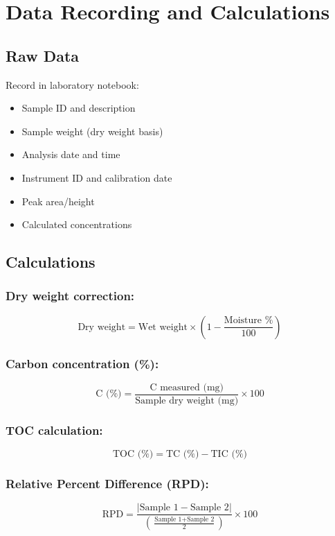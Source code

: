 \documentclass[11pt,a4paper]{article}\usepackage[]{graphicx}\usepackage[]{xcolor}
\begin{document}
\section{Data Recording and Calculations}

\subsection{Raw Data}
Record in laboratory notebook:
\begin{itemize}[noitemsep]
    \item Sample ID and description
    \item Sample weight (dry weight basis)
    \item Analysis date and time
    \item Instrument ID and calibration date
    \item Peak area/height
    \item Calculated concentrations
\end{itemize}

\subsection{Calculations}

\subsubsection{Dry weight correction:}
\begin{equation}
\text{Dry weight} = \text{Wet weight} \times \left(1 - \frac{\text{Moisture \%}}{100}\right)
\end{equation}

\subsubsection{Carbon concentration (\%):}
\begin{equation}
\text{C (\%)} = \frac{\text{C measured (mg)}}{\text{Sample dry weight (mg)}} \times 100
\end{equation}

\subsubsection{TOC calculation:}
\begin{equation}
\text{TOC (\%)} = \text{TC (\%)} - \text{TIC (\%)}
\end{equation}

\subsubsection{Relative Percent Difference (RPD):}
\begin{equation}
\text{RPD} = \frac{|\text{Sample 1} - \text{Sample 2}|}{\left(\frac{\text{Sample 1} + \text{Sample 2}}{2}\right)} \times 100
\end{equation}
\end{document}
